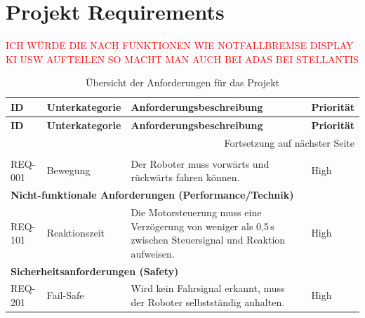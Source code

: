 
\section{Projekt Requirements}
\label{sec:Projekt Requirements}

\textcolor{red}{ICH WÜRDE DIE NACH FUNKTIONEN WIE NOTFALLBREMSE DISPLAY KI USW AUFTEILEN SO MACHT MAN AUCH BEI ADAS BEI STELLANTIS}

\begin{longtable}{|p{1.7cm}|p{4.2cm}|p{8.8cm}|p{1.9cm}|}


	\caption{Übersicht der Anforderungen für das Projekt}
	\label{tab:anforderungen_ueberarbeitet} \\
	\hline
	\textbf{ID} & \textbf{Unterkategorie} & \textbf{Anforderungsbeschreibung} & \textbf{Priorität} \\
	\hline
	\endfirsthead
	
	\hline
	\textbf{ID} & \textbf{Unterkategorie} & \textbf{Anforderungsbeschreibung} & \textbf{Priorität} \\
	\hline
	\endhead
	
	\hline
	\multicolumn{4}{r}{Fortsetzung auf nächster Seite} \\
	\endfoot
	
	\hline
	\endlastfoot
	
	\multicolumn{4}{|l|}{\textbf{Funktionale Anforderungen}} \\
	\hline
	REQ-001 & Bewegung & Der Roboter muss vorwärts und rückwärts fahren können. & High \\
	\hline
	
	\multicolumn{4}{|l|}{\textbf{Nicht-funktionale Anforderungen (Performance/Technik)}} \\
	\hline
	REQ-101 & Reaktionszeit & Die Motorsteuerung muss eine Verzögerung von weniger als 0{,}5\,s zwischen Steuersignal und Reaktion aufweisen. & High \\
	\hline

	
	\multicolumn{4}{|l|}{\textbf{Sicherheitsanforderungen (Safety)}} \\
	\hline
	REQ-201 & Fail-Safe & Wird kein Fahrsignal erkannt, muss der Roboter selbstständig anhalten. & High \\
	\hline


\end{longtable}
